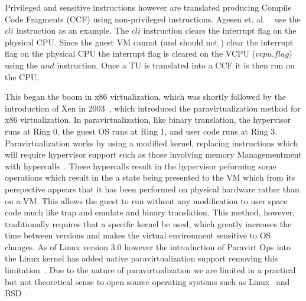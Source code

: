 Privileged and sensitive instructions however are translated producing Compile Code Fragments (CCF) using non-privileged instructions. Agesen et. al. ~\cite{agesen_evolution_2010} use the $cli$ instruction as an example. The $cli$ instruction clears the interrupt flag on the physical CPU. 
Since the guest VM cannot (and should not ) clear the interrupt flag on the physical CPU the interrupt flag is cleared on the VCPU ($vcpu.flag$) using the $and$ instruction. Once a TU is translated into a CCF it is then run on the CPU. 

This began the boom in x86 virtualization, which was shortly followed by the introduction of Xen in 2003~\cite{barham_xen_2003}, which introduced the paravirtualization method for x86 virtualization. In paravirtualization, like binary translation, the hypervisor runs at Ring 0, the guest OS runs at Ring 1, and user code runs at Ring 3.  Paravirtualization works by using a modified kernel, replacing instructions which will require hypervisor support such as those involving memory Managementment with hypercalls~\cite{barham_xen_2003}.  These hypercalls result in the hypervisor peforming some operations which result in the a state being presented to the VM which from its perspective appears that it has been performed on physical hardware rather than on a VM. This allows the guest to run without any modification to user space code much like trap and emulate and binary translation. This method, however, traditionally requires that a specific kernel be used, which greatly increases the time between versions and makes the virtual environment sensitive to OS changes. As of Linux version 3.0 however the introduction of Paravirt Ops into the Linux kernel has added native paravirtualization support removing this limitation~\cite{_understanding_????}. Due to the nature of paravirtualization we are limited in a practical but not theoretical sense to open source operating systems such as Linux~\cite{_Linux_archive} and BSD~\cite{mckusick_design_2004}.

